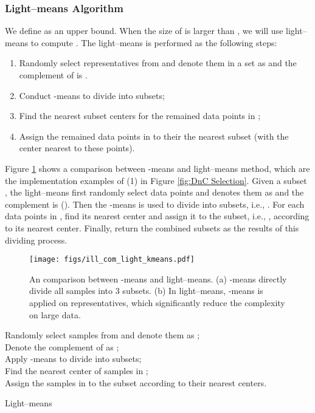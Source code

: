 \documentclass[a4paper,fleqn]{cas-dc}
\begin{document}
\subsubsection{Light--means Algorithm}


We define  as an upper bound.
When the size of  is larger than , we will use light--means to compute .
The light--means is performed as the following steps:
\begin{enumerate}
\item Randomly select  representatives from  and denote them in a set as  and the complement of  is .
\item Conduct -means to divide  into  subsets;
\item Find the nearest subset centers for the remained data points in ;
\item Assign the remained data points in  to their the nearest subset (with the center nearest to these points).
\end{enumerate}



Figure \ref{fig:light_k_means} shows a comparison between -means and light--means method, which are the implementation examples of (1) in Figure \ref{fig:DnC Selection}.
Given a subset , the light--means first randomly select  data points and denotes them as  and the complement is  ().
Then the -means is used to divide  into  subsets, i.e., .
For each data points in , find its nearest center and assign it to the subset, i.e., , according to its nearest center.
Finally, return the combined subsets  as the results of this dividing process.







\begin{figure}
    \centering
    \texttt{[image: figs/ill\_com\_light\_kmeans.pdf]}
    \caption{An comparison between -means and light--means. (a) -means directly divide all samples  into 3 subsets.
    (b) In light--means, -means is applied on  representatives, which significantly reduce the complexity on large data.
    }
    \label{fig:light_k_means}
\end{figure}


\begin{algorithm}[]
  \label{ag: Light--means}
  \SetAlgoLined
    Randomly select  samples from  and denote them as ;\\
    Denote the complement of  as ;\\
    Apply -means to divide  into  subsets;\\
    Find the nearest center of samples in ;\\
    Assign the samples in  to the subset according to their nearest centers.
  \caption{Light--means}
\end{algorithm}
\end{document}
